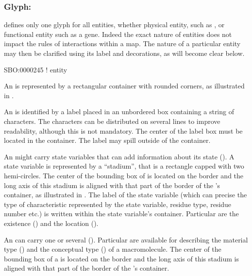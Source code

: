 
\subsubsection{Glyph: }
\label{sec:entity}

\SBGNERLone defines only one glyph for all entities, whether physical entity, such as , or functional entity such as a gene. Indeed the exact nature of entities does not impact the rules of interactions within a map. The nature of a particular entity may then be clarified using its label and decorations, as will become clear below. 

\begin{glyphDescription}

\glyphSboTerm SBO:0000245 ! entity 

\glyphContainer An  is represented by a rectangular container with rounded corners, as illustrated in .

\glyphLabel An  is identified by a label placed in an unbordered box containing a string of characters.  The characters can be distributed on several lines to improve readability, although this is not mandatory.  The center of the label box must be located in the container. The label may spill outside of the container. 

\glyphAux An  might carry state variables that can add information about its state ().  A state variable is represented by a ``stadium'', that is a rectangle capped with two hemi-circles. The center of the bounding box of  is located on the border and the long axis of this stadium is aligned with that part of the border of the 's container, as illustrated in .  The label of the state variable (which can precise the type of characteristic represented by the state variable, residue type, residue number etc.) is written within the state variable's container. Particular  are the existence () and the location ().

An  can carry one or several  ().  Particular  are available for describing the material type () and the conceptual type () of a macromolecule.  The center of the bounding box of a  is located on the border and the long axis of this stadium is aligned with that part of the border of the 's container.

\end{glyphDescription}

